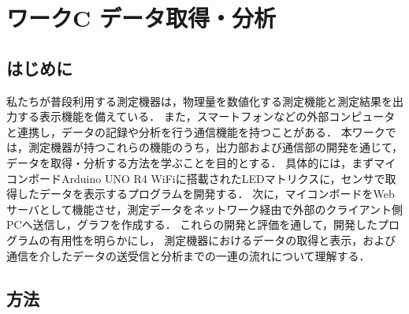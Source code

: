 \chapter{ワークC データ取得・分析}

\section{はじめに} 


私たちが普段利用する測定機器は，物理量を数値化する測定機能と測定結果を出力する表示機能を備えている．
また，スマートフォンなどの外部コンピュータと連携し，データの記録や分析を行う通信機能を持つことがある．
本ワークでは，測定機器が持つこれらの機能のうち，出力部および通信部の開発を通じて，データを取得・分析する方法を学ぶことを目的とする．
具体的には，まずマイコンボードArduino UNO R4 WiFiに搭載されたLEDマトリクスに，センサで取得したデータを表示するプログラムを開発する．
次に，マイコンボードをWebサーバとして機能させ，測定データをネットワーク経由で外部のクライアント側PCへ送信し，グラフを作成する．
これらの開発と評価を通して，開発したプログラムの有用性を明らかにし，
測定機器におけるデータの取得と表示，および通信を介したデータの送受信と分析までの一連の流れについて理解する．

\section{方法} 


